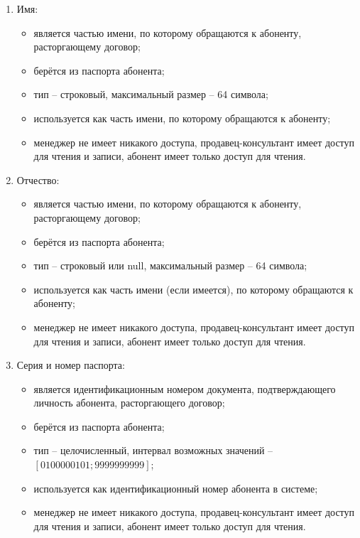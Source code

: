 \begin{enumerate}
\begin{enumerate}
        \item Имя:
        \begin{itemize}
            \item является частью имени, по которому обращаются к абоненту, расторгающему договор;
            \item берётся из паспорта абонента;
            \item тип -- строковый, максимальный размер -- 64 символа;
            \item используется как часть имени, по которому обращаются к абоненту;
            \item менеджер не имеет никакого доступа, продавец-консультант имеет доступ для чтения и записи, абонент имеет только доступ для чтения.
        \end{itemize}

        \item Отчество:
        \begin{itemize}
            \item является частью имени, по которому обращаются к абоненту, расторгающему договор;
            \item берётся из паспорта абонента;
            \item тип -- строковый или null, максимальный размер -- 64 символа;
            \item используется как часть имени (если имеется), по которому обращаются к абоненту;
            \item менеджер не имеет никакого доступа, продавец-консультант имеет доступ для чтения и записи, абонент имеет только доступ для чтения.
        \end{itemize}

        \item Серия и номер паспорта:
        \begin{itemize}
            \item является идентификационным номером документа, подтверждающего личность абонента, расторгающего договор;
            \item берётся из паспорта абонента;
            \item тип -- целочисленный, интервал возможных значений -- $[0100000101; 9999999999]$;
            \item используется как идентификационный номер абонента в системе;
            \item менеджер не имеет никакого доступа, продавец-консультант имеет доступ для чтения и записи, абонент имеет только доступ для чтения.
        \end{itemize}


\end{enumerate}
\end{enumerate}
